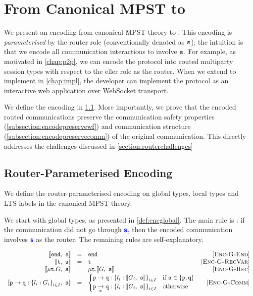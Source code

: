 \section{From Canonical MPST to \newtheory}
\label{section:encoding}

We present an encoding from canonical MPST theory
to \newtheory.
This encoding is \textit{parameterised} by the router role 
(conventionally denoted as $\mrole{s}$);
the intuition is that we encode all communication interactions
to involve $\mrole{s}$.
For example, as motivated in \cref{chap:p2p},
we can encode the  protocol
into routed multiparty session types with respect to the
eller role as the router.
When we extend \codegen to implement \newtheory in \cref{chap:impl},
the developer can implement the  protocol
as an interactive web application over WebSocket transport.

We define the encoding in \cref{subsection:encoding}.
More importantly, we prove that the encoded routed communications
preserve the communication safety
properties (\cref{subsection:encodepreservewf}) 
and communication structure (\cref{subsection:encodepreservecomm}) 
of the original 
communication. 
This directly addresses the challenges discussed in
\cref{section:routerchallenges}


\subsection{Router-Parameterised Encoding}
\label{subsection:encoding}

We define the router-parameterised encoding
on global types, local types and LTS labels in
the canonical MPST theory.

We start with global types, 
as presented in \cref{def:encglobal}.
The main rule is :
if the communication did not go through $\role{s}$,
then the encoded communication involves $\role{s}$ as the router.
The remaining rules are self-explanatory.

\begin{definition}

\doublespacing
\[
\begin{array}{rclr}
\enc{\tend}{s} &= & \tend & \rulename{Enc-G-End} \\
\enc{\trecvar}{s} &= & 
	\trecvar & \rulename{Enc-G-RecVar} \\
\enc{\trec{G}}{s} &= & 
	\trec{\enc{G}{s}} & \rulename{Enc-G-Rec} \\
\enc{\gcomm{p}{q}{l_i: G_i}{i \in I}}{s} &= & 
	\begin{cases}
	\gcomm{p}{q}{l_i: \enc{G_i}{s}}{i \in I} 
		& \text{if } \mrole{s} \in \{ \mrole{p}, \mrole{q} \} \\
	\groute{p}{q}{s}{l_i: \enc{G_i}{s}}{i \in I} 
		& \text{otherwise} \\	
	\end{cases} & \rulename{Enc-G-Comm} \\
\end{array}
\]
\singlespacing

\label{def:encglobal}
\end{definition}

